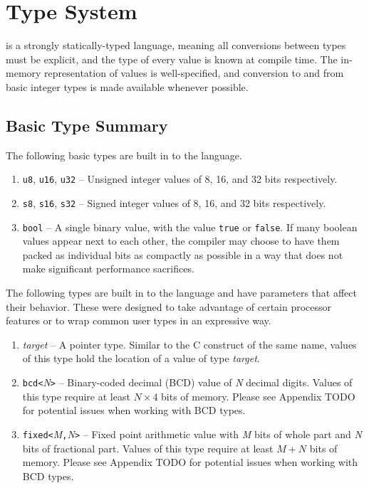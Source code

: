 \section{Type System}

\gx{} is a strongly statically-typed language, meaning all conversions
between types must be explicit, and the type of every value is known at
compile time. The in-memory representation of values is well-specified,
and conversion to and from basic integer types is made available whenever
possible.

\subsection{Basic Type Summary}

The following basic types are built in to the language.

\begin{enumerate}

\item {\tt u8}, {\tt u16}, {\tt u32} -- Unsigned integer values
of 8, 16, and 32 bits respectively.

\item {\tt s8}, {\tt s16}, {\tt s32} -- Signed integer values of 8,
16, and 32 bits respectively.

\item {\tt bool} -- A single binary value, with the value {\tt true}
or {\tt false}. If many boolean values appear next to each other, the
compiler may choose to have them packed as individual bits as compactly as
possible in a way that does not make significant performance sacrifices.

\end{enumerate}

The following types are built in to the language and have parameters that
affect their behavior. These were designed to take advantage of certain
processor features or to wrap common user types in an expressive way.

\begin{enumerate}

\item {\tt *}{\em target} -- A pointer type. Similar to the C construct
of the same name, values of this type hold the location of a value of
type {\em target}.

\item {\tt bcd<}{\em N}{\tt >} -- Binary-coded decimal (BCD) value of
{\em N} decimal digits. Values of this type require at least $N \times
4$ bits of memory. Please see Appendix TODO for potential issues when
working with BCD types.

\item {\tt fixed<}{\em M}{\tt,}{\em N}{\tt >} -- Fixed point arithmetic
value with {\em M} bits of whole part and {\em N} bits of fractional
part. Values of this type require at least $M + N$ bits of memory. Please
see Appendix TODO for potential issues when working with BCD types.

\end{enumerate}

